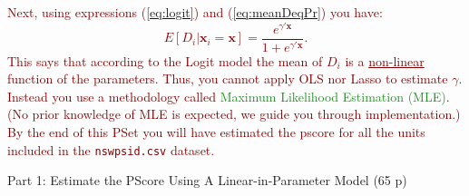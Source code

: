\documentclass[
]{article}
\begin{document}
\noindent \noindent \textcolor{Maroon}{Next, using expressions (\ref{eq:logit}) and (\ref{eq:meanDeqPr}) you have:
\begin{equation}\label{eq:meanLogit}
E[D_i|\mathbf{x}_i=\mathbf{x}]=\frac{e^{\gamma'\mathbf{x}}}{1 + e^{\gamma'\mathbf{x}}}.
\end{equation}
This says that according to the Logit model the mean of $D_i$ is a \underline{non-linear} function of the parameters. Thus, you cannot apply OLS nor Lasso to estimate $\gamma$. Instead you use a methodology called \textcolor{ForestGreen}{Maximum Likelihood Estimation (MLE)}. (No prior knowledge of MLE is expected, we guide you through implementation.) By the end of this PSet you will have estimated the pscore for all the units included in the \texttt{nswpsid.csv} dataset.}
\newpage

\begin{center}
{\LARGE Part 1: Estimate the PScore Using A Linear-in-Parameter Model (65 p)}
\end{center}
\end{document}
